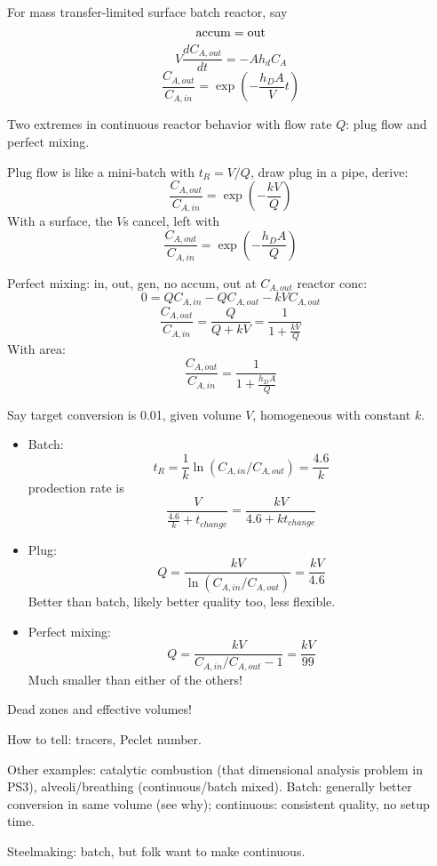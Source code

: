\documentclass{report}
\begin{document}
For mass transfer-limited surface batch reactor, say
$$\rm accum = out$$
$$V\frac{dC_{A,out}}{dt} = -Ah_dC_A$$
$$\frac{C_{A,out}}{C_{A,in}} = \exp\left(-\frac{h_DA}{V}t\right)$$

Two extremes in continuous reactor behavior with flow rate $Q$: plug flow and
perfect mixing.

Plug flow is like a mini-batch with $t_R=V/Q$, draw plug in a pipe, derive:
$$\frac{C_{A,out}}{C_{A,in}} = \exp\left(-\frac{kV}{Q}\right)$$
With a surface, the $V$s cancel, left with
$$\frac{C_{A,out}}{C_{A,in}} = \exp\left(-\frac{h_DA}{Q}\right)$$

Perfect mixing: in, out, gen, no accum, out at $C_{A,out}$ reactor conc:
$$0 = QC_{A,in} - QC_{A,out} - kVC_{A,out}$$
$$\frac{C_{A,out}}{C_{A,in}} = \frac{Q}{Q+kV} = \frac{1}{1+\frac{kV}{Q}}$$
With area:
$$\frac{C_{A,out}}{C_{A,in}} = \frac{1}{1+\frac{h_DA}{Q}}$$

Say target conversion is 0.01, given volume $V$, homogeneous with constant $k$.
\begin{itemize}
\item Batch:
  $$t_R = \frac{1}{k}\ln(C_{A,in}/C_{A,out}) = \frac{4.6}{k}$$
  prodection rate is
  $$\frac{V}{\frac{4.6}{k} + t_{change}} = \frac{kV}{4.6 + kt_{change}}$$
\item Plug:
  $$Q=\frac{kV}{\ln(C_{A,in}/C_{A,out})} = \frac{kV}{4.6}$$
  Better than batch, likely better quality too, less flexible.
\item Perfect mixing:
  $$Q = \frac{kV}{C_{A,in}/C_{A,out}-1} = \frac{kV}{99}$$
  Much smaller than either of the others!
\end{itemize}

Dead zones and effective volumes!

How to tell: tracers, Peclet number.

Other examples: catalytic combustion (that dimensional analysis problem in
PS3), alveoli/breathing (continuous/batch mixed).  Batch: generally better
conversion in same volume (see why); continuous: consistent quality, no setup
time.

Steelmaking: batch, but folk want to make continuous.
\end{document}
